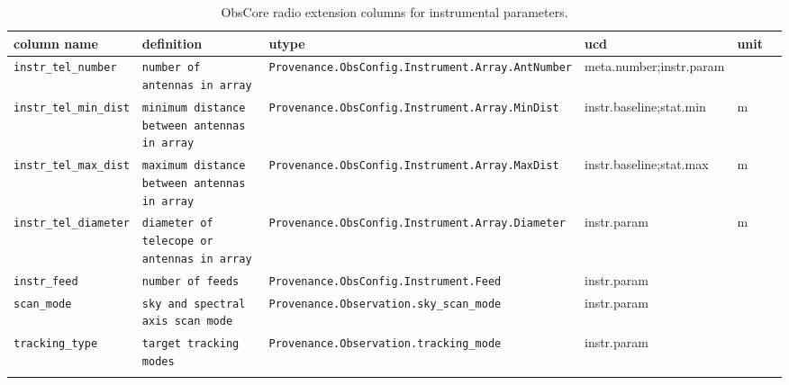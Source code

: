 \documentclass[11pt,a4paper]{ivoa}
\begin{document}
\begin{landscape}
\begin{longtable}{l p{4.2cm} | p{4cm} | l l l }
\hline
\textbf{column name}&\textbf{definition}&\textbf{utype}&\textbf{ucd}&\textbf{unit}\\
\hline
\texttt{instr\_tel\_number}&\texttt{number of antennas in array}&\texttt{Provenance.ObsConfig.\newline Instrument.Array.\newline AntNumber}&meta.number;instr.param& \\
\hline
\texttt{instr\_tel\_min\_dist}&\texttt{minimum distance between antennas in array}&\texttt{Provenance.ObsConfig.\newline Instrument.Array.\newline MinDist}&instr.baseline;stat.min&m \\
\hline
\texttt{instr\_tel\_max\_dist}&\texttt{maximum distance between antennas in array}&\texttt{Provenance.ObsConfig.\newline Instrument.Array.\newline MaxDist}&instr.baseline;stat.max&m \\
\hline
\texttt{instr\_tel\_diameter}&\texttt{diameter of telecope or antennas in array}&\texttt{Provenance.ObsConfig.\newline Instrument.Array.\newline Diameter}&instr.param&m \\
\hline
\texttt{instr\_feed}&\texttt{number of feeds}&\texttt{Provenance.ObsConfig.\newline Instrument.Feed}&instr.param&  \\
\hline
\texttt{scan\_mode}&\texttt{sky and spectral axis scan mode }&\texttt{Provenance.\newline Observation.\newline sky\_scan\_mode}&instr.param& \\
\hline
\texttt{tracking\_type}&\texttt{target tracking modes}&\texttt{Provenance.\newline Observation.\newline tracking\_mode}&instr.param& \\
\hline

\caption{ObsCore radio extension columns for instrumental parameters.}
\label{tab:ExtensionAtt_instrumental}
\end{longtable}
\end{landscape}
\end{document}
